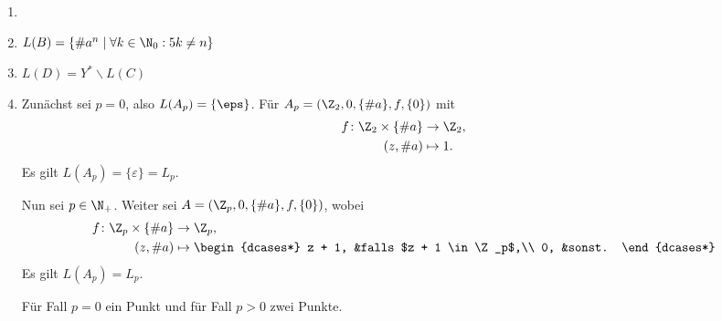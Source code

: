 \documentclass[12pt]{article}
\begin{document}
\begin{loesung}
  \begin{enumerate}
    \item {}
    \item $L(B) = \{\#a^n \mid \forall k \in \N_0 : 5 k \neq n\}$
    \item $L(D) = Y^* \smallsetminus L(C)$
    \item Zunächst sei $p = 0$, also $L(A_p)=\{\eps\}$. Für $A_p = (\Z_2, 0, \{\#a\}, f, \{0\})$ mit
          \begin{align*}
            f \colon \Z_2 \times \{\#a\} &\to     \Z_2,\\
                                (z, \#a) &\mapsto 1.
          \end{align*}
          Es gilt $L(A_p) = \{\varepsilon\} = L_p$.

          Nun sei $p \in \N_+$. Weiter sei $A = (\Z_p, 0, \{\#a\}, f, \{0\})$, wobei
          \begin{align*}
            f \colon \Z_p \times \{\#a\} &\to     \Z_p,\\
                                (z, \#a) &\mapsto \begin{dcases*}
                                                    z + 1, &falls $z + 1 \in \Z_p$,\\
                                                    0,     &sonst.
                                                  \end{dcases*}
          \end{align*}
          Es gilt $L(A_p) = L_p$.

          \begin{korrektur}
            Für Fall $p=0$ ein Punkt und für Fall $p>0$ zwei Punkte.
          \end{korrektur}
  \end{enumerate}
\end{loesung}
\end{document}
